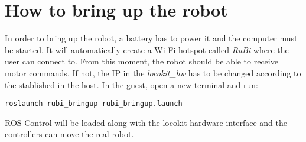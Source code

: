 \section{How to bring up the robot} %
\label{sec:how_to_bring_up_the_robot}
In order to bring up the robot, a battery has to power it and the computer must be started.
It will automatically create a Wi-Fi hotspot called \textit{RuBi} where the user can connect to.
From this moment, the robot should be able to receive motor commands.
If not, the IP in the \textit{locokit\_hw} has to be changed according to the stablished in the host.
In the guest, open a new terminal and run:

\begin{lstlisting}
roslaunch rubi_bringup rubi_bringup.launch
\end{lstlisting}

ROS Control will be loaded along with the locokit hardware interface and the controllers can move the real robot.
